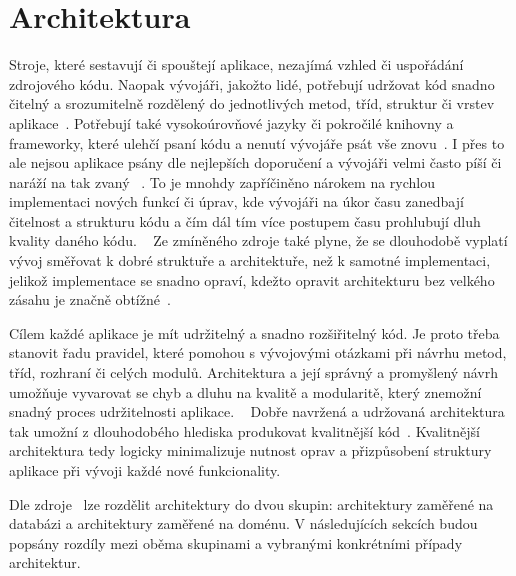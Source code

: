 \section{Architektura}

Stroje,
které sestavují či spouštejí aplikace,
nezajímá vzhled či uspořádání zdrojového kódu.
Naopak vývojáři,
jakožto lidé,
potřebují udržovat kód snadno čitelný a srozumitelně rozdělený do jednotlivých
metod, tříd, struktur či vrstev aplikace~\cite{architecture}.
Potřebují také vysokoúrovňové jazyky či pokročilé knihovny a frameworky,
které ulehčí psaní kódu a nenutí vývojáře psát vše znovu~\cite{architecture}.
I přes to ale nejsou aplikace psány dle nejlepších doporučení
a vývojáři velmi často píší či naráží na tak zvaný ~\cite{architecture}.
To je mnohdy zapříčiněno nárokem na rychlou implementaci nových funkcí či úprav,
kde vývojáři na úkor času zanedbají čitelnost a strukturu kódu
a čím dál tím více postupem času prohlubují dluh kvality daného kódu.
\emph{}~\cite[kapitola~15]{martin_clean_architecture}
Ze zmíněného zdroje také plyne,
že se dlouhodobě vyplatí vývoj směřovat k dobré struktuře a architektuře,
než k samotné implementaci,
jelikož implementace se snadno opraví,
kdežto opravit architekturu bez velkého zásahu
je značně obtížné~\cite[kapitola~15]{martin_clean_architecture}.

Cílem každé aplikace je mít udržitelný a snadno rozšiřitelný kód.
Je proto třeba stanovit řadu pravidel,
které pomohou s vývojovými otázkami při návrhu metod, tříd, rozhraní či
celých modulů.
Architektura a její správný a promyšlený návrh umožňuje vyvarovat
se chyb a dluhu na kvalitě a modularitě,
který znemožní snadný proces udržitelnosti aplikace.
\emph{}~\cite[kapitola~15]{martin_clean_architecture}
Dobře navržená a udržovaná architektura tak umožní z dlouhodobého hlediska
produkovat kvalitnější kód~\cite[kapitola~15]{martin_clean_architecture}.
Kvalitnější architektura tedy logicky minimalizuje nutnost oprav a
přizpůsobení struktury aplikace při vývoji každé nové funkcionality.

Dle zdroje~\cite{architecture} lze rozdělit architektury do dvou skupin:
architektury zaměřené na databázi a architektury zaměřené na doménu.
V následujících sekcích budou popsány rozdíly mezi oběma skupinami
a vybranými konkrétními případy architektur.

